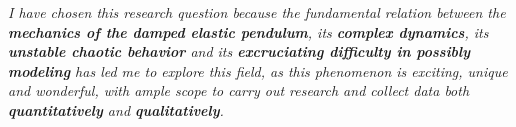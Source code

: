 \textit{I have chosen this research question because the fundamental relation between the \textbf{mechanics of the damped elastic pendulum}, its \textbf{complex dynamics}, its \textbf{unstable chaotic behavior} and its \textbf{excruciating difficulty in possibly modeling} has led me to explore this field, as this phenomenon is exciting, unique and wonderful, with ample scope to carry out research and collect data both \textbf{quantitatively} and \textbf{qualitatively}.}

